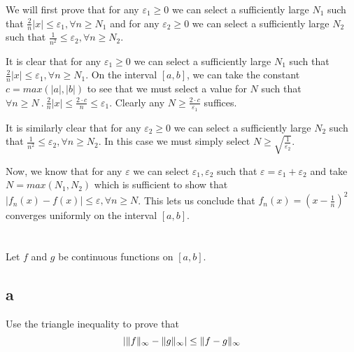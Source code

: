 \documentclass[]{article}
\DeclarePairedDelimiter\norm{\lVert}{\rVert}
\begin{document}
		We will first prove that for any $\varepsilon_1 \geq 0$ we can select a sufficiently large $N_1$ such that $\frac{2}{n}|x| \leq \varepsilon_1, \forall n \geq N_1$ and for any $\varepsilon_2 \geq 0$ we can select a sufficiently large $N_2$ such that $\frac{1}{n^2} \leq \varepsilon_2, \forall n \geq N_2$. 

		It is clear that for any $\varepsilon_1 \geq 0$ we can select a sufficiently large $N_1$ such that $\frac{2}{n}|x| \leq \varepsilon_1, \forall n \geq N_1$. On the interval $[a, b]$, we can take the constant $c = max(|a|, |b|)$ to see that we must select a value for $N$ such that $\forall n \geq N\ .\ \frac{2}{n} |x| \leq \frac{2 \cdot c}{n} \leq \varepsilon_1$. Clearly any $N \geq \frac{2 \cdot c}{\varepsilon_1}$ suffices. 

		It is similarly clear that for any $\varepsilon_2 \geq 0$ we can select a sufficiently large $N_2$ such that $\frac{1}{n^2} \leq \varepsilon_2, \forall n \geq N_2$. In this case we must simply select $N \geq \sqrt{\frac{1}{\varepsilon_2}}$. 

		Now, we know that for any $\varepsilon$ we can select $\varepsilon_1, \varepsilon_2$ such that $\varepsilon = \varepsilon_1 + \varepsilon_2$ and take $N = max(N_1, N_2)$ which is sufficient to show that $|f_n(x) - f(x)| \leq \varepsilon, \forall n \geq N$. This lets us conclude that $f_n(x) = \left ( x - \frac{1}{n} \right ) ^2$ converges uniformly on the interval $[a, b]$. 

	\section{}
		\begin{em}
			Let $f$ and $g$ be continuous functions on $[a, b]$. 
		\end{em}

		\subsection*{a}
		\begin{em}
			Use the triangle inequality to prove that \[| \norm{f}_\infty - \norm{g}_\infty | \leq \norm{f - g}_\infty \]
		\end{em}


\end{document}

